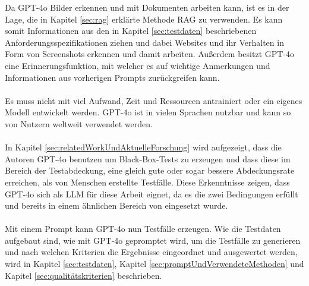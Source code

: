 \documentclass[12pt,toc=bib,toc=listof]{scrreprt}
\begin{document}
\noindent Da GPT-4o Bilder erkennen und mit Dokumenten arbeiten kann, ist es in der Lage, die in Kapitel \ref{sec:rag} erklärte Methode RAG zu verwenden. Es kann somit Informationen aus den in Kapitel \ref{sec:testdaten} beschriebenen Anforderungsspezifikationen ziehen und dabei Websites und ihr Verhalten in Form von Screenshots erkennen und damit arbeiten. Außerdem besitzt GPT-4o eine Erinnerungsfunktion, mit welcher es auf wichtige Anmerkungen und Informationen aus vorherigen Prompts zurückgreifen kann.\\
\\
Es muss nicht mit viel Aufwand, Zeit und Ressourcen antrainiert oder ein eigenes Modell entwickelt werden. GPT-4o ist in vielen Sprachen nutzbar und kann so von Nutzern weltweit verwendet werden.\\
\\
In Kapitel \ref{sec:relatedWorkUndAktuelleForschung} wird aufgezeigt, dass die Autoren \textcite{Kirinuki2024} GPT-4o benutzen um Black-Box-Tests zu erzeugen und dass diese im Bereich der Testabdeckung, eine gleich gute oder sogar bessere Abdeckungsrate erreichen, als von Menschen erstellte Testfälle. Diese Erkenntnisse zeigen, dass GPT-4o sich als LLM für diese Arbeit eignet, da es die zwei Bedingungen erfüllt und bereits in einem ähnlichen Bereich von \textcite{Kirinuki2024} eingesetzt wurde.\\
\\
Mit einem Prompt kann GPT-4o nun Testfälle erzeugen. Wie die Testdaten aufgebaut sind, wie mit GPT-4o gepromptet wird, um die Testfälle zu generieren und nach welchen Kriterien die Ergebnisse eingeordnet und ausgewertet werden, wird in Kapitel \ref{sec:testdaten}, Kapitel \ref{sec:promptUndVerwendeteMethoden} und Kapitel \ref{sec:qualitätskriterien} beschrieben.
\end{document}
